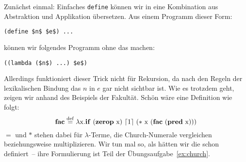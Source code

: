 Zunächst einmal: Einfaches \lstinline{define} können wir in eine
Kombination aus Abstraktion und Applikation übersetzen.  Aus einem
Programm dieser Form:
%
\begin{lstlisting}
(define $n$ $e$) ...
\end{lstlisting}
%
können wir folgendes Programm ohne das  machen:
%
\begin{lstlisting}
((lambda ($n$) ...) $e$)
\end{lstlisting}
%
Allerdings funktioniert dieser Trick nicht für Rekursion, da nach den
Regeln der lexikalischen Bindung das $n$ in $e$ gar nicht sichtbar
ist.  Wie es trotzdem geht, zeigen wir anhand des Beispiels der Fakultät.
Schön wäre eine Definition wie folgt:
%
\begin{displaymath}
  \mathbf{fac} \stackrel{\rm def}{=}{} \lambda \mathrm x.\mathbf{if}~(\mathbf{zerop}~\mathrm
  x)~\lceil 1\rceil ~(\ast~\mathrm x~(\mathbf{fac}~(\mathbf{pred}~\mathrm x)))
\end{displaymath}
%
$=$ und $\ast$ stehen dabei für $\lambda$-Terme, die Church-Numerale
vergleichen beziehungsweise multiplizieren.  Wir tun mal so, als
hätten wir die schon definiert~-- ihre Formulierung ist Teil der
Übungsaufgabe~\ref{ex:church}.

